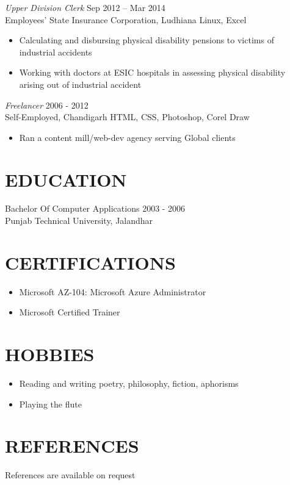 \documentclass[margin, 10pt]{res} %
\begin{document}
\begin{resume}
{\sl Upper Division Clerk} \hfill Sep 2012 – Mar 2014 \\
Employees' State Insurance Corporation, Ludhiana \hfill Linux, Excel 
\begin{itemize}
\item Calculating and disbursing physical disability pensions to victims of industrial accidents
\item Working with doctors at ESIC hospitals in assessing physical disability arising out of industrial accident 
\end{itemize} 

{\sl Freelancer} \hfill 2006 - 2012 \\
Self-Employed, Chandigarh \hfill HTML, CSS, Photoshop, Corel Draw 
\begin{itemize}
\item Ran a content mill/web-dev agency serving Global clients
\end{itemize}


\section{EDUCATION}
Bachelor Of Computer Applications \hfill 2003 - 2006 \\
Punjab Technical University, Jalandhar 

\section{CERTIFICATIONS}
\begin{itemize}
\item Microsoft AZ-104: Microsoft Azure Administrator 
\item Microsoft Certified Trainer
\end{itemize}

\section{HOBBIES}
\begin{itemize}
\item Reading and writing poetry, philosophy, fiction, aphorisms
\item Playing the flute
\end{itemize}

\section{REFERENCES}
References are available on request


\end{resume}
\end{document}
